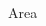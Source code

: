 \documentclass[a4paper]{article}
\begin{document}
\printVSLEventHeader{}{}
\begin{center}
\begin{vsltext}{3cm}{3.5cm}
    \vspace{3cm}

Area \AreaA
\end{vsltext}

\end{center}
\end{document}

